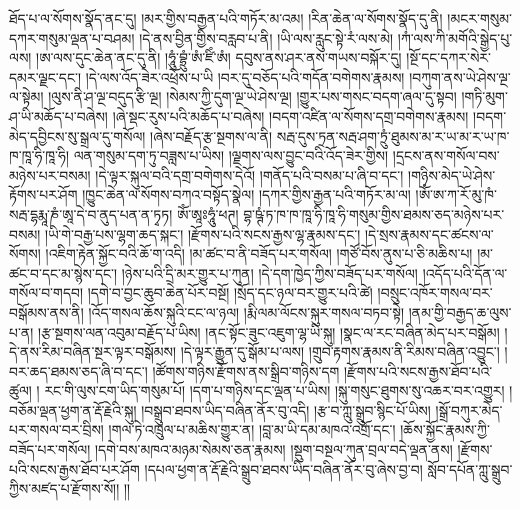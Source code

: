 ཐོད་པ་ལ་སོགས་སྣོད་ནང་དུ། །མར་གྱིས་བརྒྱན་པའི་གཏོར་མ་འམ། །རིན་ཆེན་ལ་སོགས་སྣོད་དུ་ནི། །མངར་གསུམ་དཀར་གསུམ་ལྡན་པ་བཤམ། །དེ་ནས་བྱིན་གྱིས་བརླབ་པ་ནི། །ཡི་ལས་རླུང་སྟེ་རཾ་ལས་མེ། །ཀཾ་ལས་ཀི་མགོའི་སྒྱེད་པུ་ལས། །ཨ་ལས་དུང་ཆེན་ནང་དུ་ནི། །ཧཱུཾ་བྷྲུཾ་ཨཾ་ཛིཾ་ཨཾ། དབུས་ནས་ཤར་ནས་གཡས་བསྐོར་དུ། །སྔོ་དང་དཀར་སེར་དམར་ལྗང་དང་། །དེ་ལས་འོད་ཟེར་འཕྲོས་པ་ཡི །བར་དུ་བཅོད་པའི་གདོན་བགེགས་རྣམས། །བཀུག་ནས་ཡེ་ཤེས་ལྔ་ལ་སྟེམ། །ལུས་ནི་ཤ་ལྔ་བདུད་རྩི་ལྔ། །སེམས་ཀྱི་དུག་ལྔ་ཡེ་ཤེས་ལྔ། །གྱུར་པས་གསང་བདག་ཞལ་དུ་སྟབ། །གཏི་མུག་ཤ་ཡི་མཆོད་པ་བཞེས། །ཞེ་སྡང་རུས་པའི་མཆོད་པ་བཞེས། །བདག་འཛིན་ལ་སོགས་དགྲ་བགེགས་རྣམས། །བདག་མེད་དབྱིངས་སུ་སྒྲལ་དུ་གསོལ། །ཞེས་བརྗོད་རྩ་སྔགས་ལ་ནི། སརྦ་དུས་ཏྲན་སརྦ་ཤག་ཏྲུཾ་ཐུམས་མ་ར་ཡ་མ་ར་ཡ་ཁ་ཁ་ཁཱ་ཧི་ཁཱ་ཧི། ལན་གསུམ་དག་ཏུ་བཟླས་པ་ཡིས། །ལྗགས་ལས་བྱུང་བའི་འོད་ཟེར་གྱིས། །དྲངས་ནས་གསོལ་བས་མཉེས་པར་བསམ། །དེ་ལྟར་སྐུལ་བའི་དགྲ་བགེགས་དེའོ། །གནོད་པའི་བསམ་པ་ཞི་བ་དང་། །གཉིས་མེད་ཡེ་ཤེས་རྟོགས་པར་ཤོག །ཁྱུང་ཆེན་ལ་སོགས་བཀའ་བསྟོད་སྣེལ། །དཀར་གྱིས་རྒྱན་པའི་གཏོར་མ་ལ། །ཨོཾ་ཨ་ཀ་རོ་མུ་ཁཾ་སརྦ་དྷརྨཱ་ཎཾ་ཨཱ་དེ་བ་ནུད་པན་ན་ཏྭཏ། ཨོཾ་ཨཱཿཧཱུཾ་ཕཊ། བྷ་ཥྚཾ་ཏ་ཁ་ཁ་ཁཱ་ཧི་ཁཱ་ཧི་གསུམ་གྱིས་ཐམས་ཅད་མཉེས་པར་བསམ། །ཡི་གེ་བརྒྱ་པས་ལྷག་ཆད་སྐང་། །རྫོགས་པའི་སངས་རྒྱས་ལྷ་རྣམས་དང་། །དེ་སྲས་རྣམས་དང་ཚངས་ལ་སོགས། །འཇིག་རྟེན་སྐྱོང་བའི་ཆོ་ག་འདི། །མ་ཚང་བ་ནི་བཟོད་པར་གསོལ། །གཙོ་བོས་ནུས་པ་ཅི་མཆིས་པ། །མ་ཚང་བ་དང་མ་སྙེས་དང་། །ཉེས་པའི་དྲི་མར་གྱུར་པ་ཀུན། །དེ་དག་ཁྱེད་ཀྱིས་བཟོད་པར་གསོལ། །འདོད་པའི་དོན་ལ་གསོལ་བ་གདབ། །དགེ་བ་བྱང་ཆུབ་ཆེན་པོར་བསྔོ། །སྲོད་དང་ཉལ་བར་གྱུར་པའི་ཚེ། །བསྲུང་འཁོར་གསལ་བར་བསྒོམས་ནས་ནི། །འོད་གསལ་ཆོས་སྐུའི་ངང་ལ་ཉལ། །རྨི་ལམ་ལོངས་སྐུར་གསལ་བཏབ་སྟེ། །ནམ་གྱི་བརྒྱད་ཆ་ལུས་པ་ན། །རྩ་སྔགས་ལན་འབུམ་བརྗོད་པ་ཡིས། །ནང་སྟོང་ཟུང་འཇུག་ལྷ་ཡི་སྐུ། །སྣང་ལ་རང་བཞིན་མེད་པར་བསྒོམ། །དེ་ནས་རིམ་བཞིན་སྔར་ལྟར་བསྒོམས། །དེ་ལྟར་རྒྱུན་དུ་སྒོམ་པ་ལས། །གྲུབ་རྟགས་རྣམས་ནི་རིམས་བཞིན་འབྱུང་། །བར་ཆད་ཐམས་ཅད་ཞི་བ་དང་། །ཚོགས་གཉིས་རྫོགས་ནས་སྒྲིབ་གཉིས་དག །རྫོགས་པའི་སངས་རྒྱས་ཐོབ་པའི་ཚུལ། །
རང་གི་ལུས་ངག་ཡིད་གསུམ་པོ། །དག་པ་གཉིས་དང་ལྡན་པ་ཡིས། །སྐུ་གསུང་ཐུགས་སུ་འཆར་བར་འགྱུར། །བཅོམ་ལྡན་ཕྱག་ན་རྡོ་རྗེའི་སྐུ། །བསྒྲུབ་ཐབས་ཡིད་བཞིན་ནོར་བུ་འདི། །རྩ་བ་ཀླུ་སྒྲུབ་སྙིང་པོ་ཡིས། །སྒྲོ་བཀུར་མེད་པར་གསལ་བར་བྲིས། །གལ་ཏེ་འཁྲུལ་པ་མཆིས་གྱུར་ན། །བླ་མ་ཡི་དམ་མཁའ་འགྲོ་དང་། །ཆོས་སྐྱོང་རྣམས་ཀྱི་བཟོད་པར་གསོལ། །དགེ་བས་མཁའ་མཉམ་སེམས་ཅན་རྣམས། །སྡུག་བསྔལ་ཀུན་བྲལ་བདེ་ལྡན་ནས། །རྫོགས་པའི་སངས་རྒྱས་ཐོབ་པར་ཤོག །དཔལ་ཕྱག་ན་རྡོ་རྗེའི་སྒྲུབ་ཐབས་ཡིད་བཞིན་ནོར་བུ་ཞེས་བྱ་བ། སློབ་དཔོན་ཀླུ་སྒྲུབ་ཀྱིས་མཛད་པ་རྫོགས་སོ།། །།